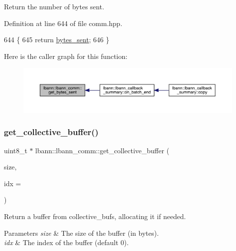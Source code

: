 Return the number of bytes sent. 

Definition at line 644 of file comm.\+hpp.


\begin{DoxyCode}
644                                        \{
645     \textcolor{keywordflow}{return} \hyperlink{classlbann_1_1lbann__comm_ad1f146ae7337ece6266fd307944928e0}{bytes\_sent};
646   \}
\end{DoxyCode}
Here is the caller graph for this function\+:\nopagebreak
\begin{figure}[H]
\begin{center}
\leavevmode
\includegraphics[width=350pt]{classlbann_1_1lbann__comm_afe3d3d12c544b43c478b968ef4226561_icgraph}
\end{center}
\end{figure}
\mbox{\label{classlbann_1_1lbann__comm_ae925ac5eaf2895717c709b252961b3bf}} 
\subsubsection{\texorpdfstring{get\+\_\+collective\+\_\+buffer()}{get\_collective\_buffer()}}
{\footnotesize\ttfamily uint8\+\_\+t $\ast$ lbann\+::lbann\+\_\+comm\+::get\+\_\+collective\+\_\+buffer (\begin{DoxyParamCaption}\item[{size\+\_\+t}]{size,  }\item[{size\+\_\+t}]{idx = {} }\end{DoxyParamCaption})\hspace{0.3cm}{\ttfamily [private]}}

Return a buffer from collective\+\_\+bufs, allocating it if needed. 
\begin{DoxyParams}{Parameters}
{\em size} & The size of the buffer (in bytes). \\
\hline
{\em idx} & The index of the buffer (default 0). \\
\hline
\end{DoxyParams}


